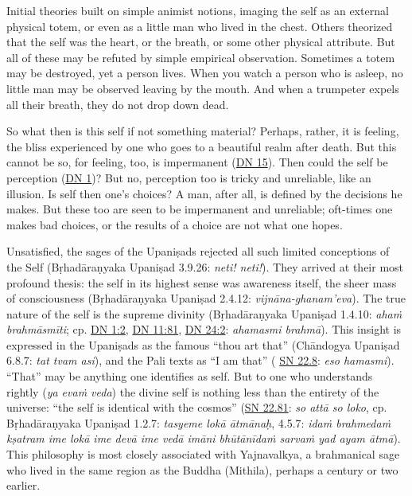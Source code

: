 \documentclass[12pt,openany]{book}%
\begin{document}
Initial theories built on simple animist notions, imaging the self as an external physical totem, or even as a little man who lived in the chest. Others theorized that the self was the heart, or the breath, or some other physical attribute. But all of these may be refuted by simple empirical observation. Sometimes a totem may be destroyed, yet a person lives. When you watch a person who is asleep, no little man may be observed leaving by the mouth. And when a trumpeter expels all their breath, they do not drop down dead.

So what then is this self if not something material? Perhaps, rather, it is feeling, the bliss experienced by one who goes to a beautiful realm after death. But this cannot be so, for feeling, too, is impermanent (\href{https://suttacentral.net/dn15}{DN 15}). Then could the self be perception (\href{https://suttacentral.net/dn1}{DN 1})? But no, perception too is tricky and unreliable, like an illusion. Is self then one’s choices? A man, after all, is defined by the decisions he makes. But these too are seen to be impermanent and unreliable; oft-times one makes bad choices, or the results of a choice are not what one hopes.

Unsatisfied, the sages of the \textsanskrit{Upaniṣads} rejected all such limited conceptions of the Self (\textsanskrit{Bṛhadāraṇyaka} \textsanskrit{Upaniṣad} 3.9.26: \textit{neti! neti!}). They arrived at their most profound thesis: the self in its highest sense was awareness itself, the sheer mass of consciousness (\textsanskrit{Bṛhadāraṇyaka} \textsanskrit{Upaniṣad} 2.4.12: \textit{\textsanskrit{vijnāna}-ghanam’eva}). The true nature of the self is the supreme divinity (\textsanskrit{Bṛhadāraṇyaka} \textsanskrit{Upaniṣad} 1.4.10: \textit{\textsanskrit{ahaṁ} \textsanskrit{brahmāsmīti}}; cp. \href{https://suttacentral.net/dn1\#2}{DN 1:2}, \href{https://suttacentral.net/dn11\#81}{DN 11:81}, \href{https://suttacentral.net/dn24\#2}{DN 24:2}: \textit{ahamasmi \textsanskrit{brahmā}}). This insight is expressed in the \textsanskrit{Upaniṣads} as the famous “thou art that” (\textsanskrit{Chāndogya} \textsanskrit{Upaniṣad} 6.8.7: \textit{tat tvam asi}), and the Pali texts as “I am that” ( \href{https://suttacentral.net/sn22.8}{SN 22.8}: \textit{eso hamasmi}). “That” may be anything one identifies as self. But to one who understands rightly (\textit{ya \textsanskrit{evaṁ} veda}) the divine self is nothing less than the entirety of the universe: “the self is identical with the cosmos” (\href{https://suttacentral.net/sn22.81}{SN 22.81}: \textit{so \textsanskrit{attā} so loko}, cp. \textsanskrit{Bṛhadāraṇyaka} \textsanskrit{Upaniṣad} 1.2.7: \textit{tasyeme \textsanskrit{lokā} \textsanskrit{ātmānaḥ}}, 4.5.7: \textit{\textsanskrit{idaṁ} \textsanskrit{brahmedaṁ} \textsanskrit{kṣatram} ime \textsanskrit{lokā} ime \textsanskrit{devā} ime \textsanskrit{vedā} \textsanskrit{imāni} \textsanskrit{bhūtānīdaṁ} \textsanskrit{sarvaṁ} yad ayam \textsanskrit{ātmā}}). This philosophy is most closely associated with Yajnavalkya, a brahmanical sage who lived in the same region as the Buddha (Mithila), perhaps a century or two earlier.
\end{document}
